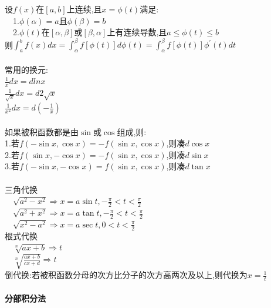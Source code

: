 \documentclass{article}
\begin{document}
\begin{flushleft}
	设$f(x)$在$[a,b]$上连续,且$x=\phi(t)$满足:\\
	\ \ 1.$\phi(\alpha)=a$且$\phi(\beta)=b$\\
	\ \ 2.$\phi(t)$在$[\alpha,\beta]$或$[\beta,\alpha]$上有连续导数,且$a\le \phi(t)\le b$\\
	则$\int_{a}^{b}f(x)dx=\int_{\alpha}^{\beta}f[\phi(t)]d\phi(t)=\int_{\alpha}^{\beta}f[\phi(t)]\phi^{'}(t)dt$\\
	~\\
	常用的换元:\\
	$\frac{1}{x}dx=dlnx$\\
	$\frac{1}{\sqrt{x}}dx=d2\sqrt{x}$\\
	$\frac{1}{x^2}dx=d(-\frac{1}{x})$\\
	~\\
	如果被积函数都是由$\sin$或$\cos$组成,则:\\
	1.若$f(-\sin x,\cos x)=-f(\sin x,\cos x)$,则凑$d\cos x$\\
	2.若$f(\sin x,-\cos x)=-f(\sin x,\cos x)$,则凑$d\sin x$\\
	3.若$f(-\sin x,-\cos x)=f(\sin x,\cos x)$,则凑$d\tan x$\\
	~\\
	三角代换\\
	\ \ $\sqrt{a^2-x^2} \Rightarrow x=a\sin t, -\frac{\pi}{2}<t<\frac{\pi}{2}$\\
	\ \ $\sqrt{a^2+x^2} \Rightarrow x=a\tan t, -\frac{\pi}{2}<t<\frac{\pi}{2}$\\
	\ \ $\sqrt{x^2-a^2} \Rightarrow x=a\sec t, 0<t<\frac{\pi}{2}$\\
	根式代换\\
	\ \ $\sqrt[n]{ax+b} \Rightarrow t$\\
	\ \ $\sqrt[n]{\frac{ax+b}{cx+d}} \Rightarrow t$\\
	倒代换:若被积函数分母的次方比分子的次方高两次及以上,则代换为$x=\frac{1}{t}$\\
	
	~\\ \textbf{分部积分法} \\~\\
	

\end{flushleft}
\end{document}
